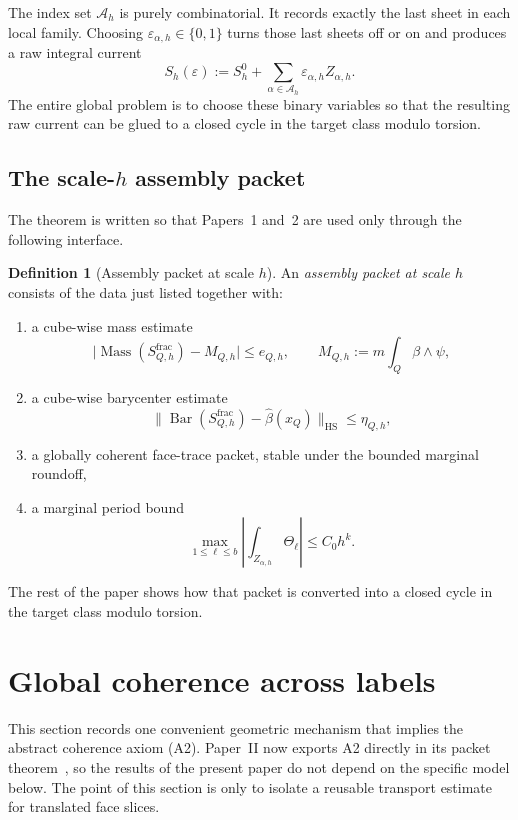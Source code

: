 \documentclass[11pt]{article}
\numberwithin{equation}{section}
\theoremstyle{plain}
\theoremstyle{definition}
\newtheorem{definition}[theorem]{Definition}
\theoremstyle{remark}
\DeclareMathOperator{\Mass}{Mass}
\DeclareMathOperator{\HS}{HS}
\newcommand{\calA}{\mathcal{A}}
\newcommand{\Bary}{\operatorname{Bar}}
\begin{document}
The index set $\calA_h$ is purely combinatorial.  It records exactly the last sheet in each local family.  Choosing $\varepsilon_{\alpha,h}\in\{0,1\}$ turns those last sheets off or on and produces a raw integral current
\[
S_h(\varepsilon):=S_h^0+\sum_{\alpha\in\calA_h}\varepsilon_{\alpha,h} Z_{\alpha,h}.
\]
The entire global problem is to choose these binary variables so that the resulting raw current can be glued to a closed cycle in the target class modulo torsion.

\subsection{The scale-$h$ assembly packet}

The theorem is written so that Papers~1 and~2 are used only through the following interface.

\begin{definition}[Assembly packet at scale $h$]
An \emph{assembly packet at scale $h$} consists of the data just listed together with:
\begin{enumerate}
\item a cube-wise mass estimate
\[
\bigl|\Mass(S_{Q,h}^{\mathrm{frac}})-M_{Q,h}\bigr|\le e_{Q,h},
\qquad
M_{Q,h}:=m\int_Q \beta\wedge\psi,
\]
\item a cube-wise barycenter estimate
\[
\bigl\|\Bary(S_{Q,h}^{\mathrm{frac}})-\widehat\beta(x_Q)\bigr\|_{\HS}\le \eta_{Q,h},
\]
\item a globally coherent face-trace packet, stable under the bounded marginal roundoff,
\item a marginal period bound
\[
\max_{1\le \ell\le b}\left|\int_{Z_{\alpha,h}}\Theta_\ell\right|\le C_0 h^k.
\]
\end{enumerate}
\end{definition}

The rest of the paper shows how that packet is converted into a closed cycle in the target class modulo torsion.

\section{Global coherence across labels}\label{sec:coherence}

This section records one convenient geometric mechanism that implies the abstract coherence axiom (A2).  Paper~II now exports A2 directly in its packet theorem~\cite[Thm.~1.1]{Washburn26II}, so the results of the present paper do not depend on the specific model below.  The point of this section is only to isolate a reusable transport estimate for translated face slices.
\end{document}
